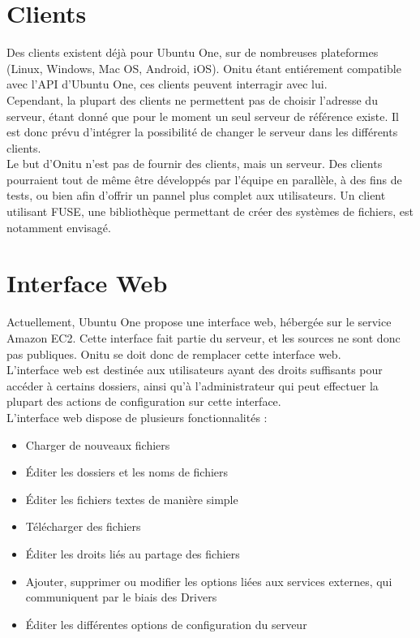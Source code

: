 \section{Clients}
Des clients existent déjà pour Ubuntu One, sur de nombreuses plateformes (Linux, Windows, Mac OS, Android, iOS). Onitu étant entiérement compatible avec l'API d'Ubuntu One, ces clients peuvent interragir avec lui.\\

Cependant, la plupart des clients ne permettent pas de choisir l'adresse du serveur, étant donné que pour le moment un seul serveur de référence existe. Il est donc prévu d'intégrer la possibilité de changer le serveur dans les différents clients.\\

Le but d'Onitu n'est pas de fournir des clients, mais un serveur. Des clients pourraient tout de même être développés par l'équipe en parallèle, à des fins de tests, ou bien afin d'offrir un pannel plus complet aux utilisateurs. Un client utilisant FUSE, une bibliothèque permettant de créer des systèmes de fichiers, est notamment envisagé.\\

\section{Interface Web}
Actuellement, Ubuntu One propose une interface web, hébergée sur le service Amazon EC2. Cette interface fait partie du serveur, et les sources ne sont donc pas publiques.
Onitu se doit donc de remplacer cette interface web.\\

L'interface web est destinée aux utilisateurs ayant des droits suffisants pour accéder à certains dossiers, ainsi qu'à l'administrateur qui peut effectuer la plupart des actions de configuration sur cette interface.\\

L'interface web dispose de plusieurs fonctionnalités :
\begin{itemize}
    \item Charger de nouveaux fichiers
    \item Éditer les dossiers et les noms de fichiers
    \item Éditer les fichiers textes de manière simple
    \item Télécharger des fichiers
    \item Éditer les droits liés au partage des fichiers
    \item Ajouter, supprimer ou modifier les options liées aux services externes, qui communiquent par le biais des Drivers
    \item Éditer les différentes options de configuration du serveur
\end{itemize}